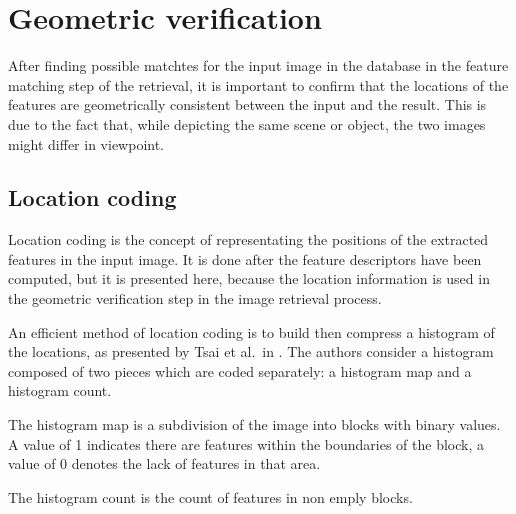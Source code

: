 \section{Geometric verification}
\label{sec:geometric_verification}

After finding possible matchtes for the input image in the database in the feature matching step of the retrieval, it is important to confirm that the locations of the features are geometrically consistent between the input and the result. This is due to the fact that, while depicting the same scene or object, the two images might differ in viewpoint.

\subsection{Location coding}

Location coding is the concept of representating the positions of the extracted features in the input image. It is done after the feature descriptors have been computed, but it is presented here, because the location information is used in the geometric verification step in the image retrieval process.

An efficient method of location coding is to build then compress a histogram of the locations, as presented by Tsai et al.\ in \cite{tsai2010fast}. The authors consider a histogram composed of two pieces which are coded separately: a histogram map and a histogram count.

The histogram map is a subdivision of the image into blocks with binary values. A value of 1 indicates there are features within the boundaries of the block, a value of 0 denotes the lack of features in that area.

The histogram count is the count of features in non emply blocks.

